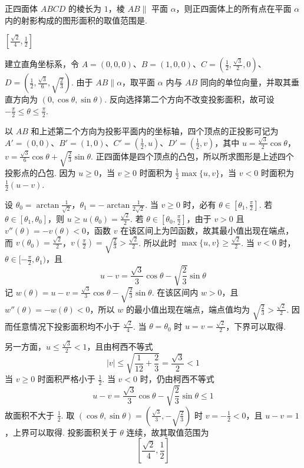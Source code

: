 \begin{problem}
正四面体 \(ABCD\) 的棱长为 \(1\)，棱 \(AB \parallel\) 平面 \(\alpha\)，则正四面体上的所有点在平面 \(\alpha\) 内的射影构成的图形面积的取值范围是\fillinblank{}.

\begin{answer}
\(\left[\frac{\sqrt{2}}{4}, \frac{1}{2}\right]\)
\end{answer}

\begin{solution}
建立直角坐标系，令 \(A=(0,0,0)\)、\(B=(1,0,0)\)、\(C=\left(\frac12,\frac{\sqrt3}{2},0\right)\)、\(D=\left(\frac12,\frac{\sqrt3}{6},\sqrt{\frac23}\right)\). 由于 \(AB\parallel\alpha\)，取平面 \(\alpha\) 内与 \(AB\) 同向的单位向量，并取其垂直方向为 \(\left(0,\cos\theta,\sin\theta\right)\). 反向选择第二个方向不改变投影面积，故可设 \(-\frac\pi2\leqslant\theta\leqslant\frac\pi2\).

以 \(AB\) 和上述第二个方向为投影平面内的坐标轴，四个顶点的正投影可记为 \(A'=(0,0)\)、\(B'=(1,0)\)、\(C'=\left(\frac12,u\right)\)、\(D'=\left(\frac12,v\right)\)，其中 \(u=\frac{\sqrt3}{2}\cos\theta\)，\(v=\frac{\sqrt3}{6}\cos\theta+\sqrt{\frac23}\sin\theta\). 正四面体是四个顶点的凸包，所以所求图形是上述四个投影点的凸包. 因为 \(u\geqslant0\)，当 \(v\geqslant0\) 时面积为 \(\frac12\max\{u,v\}\)，当 \(v<0\) 时面积为 \(\frac12(u-v)\).

设 \(\theta_0=\arctan\frac1{\sqrt2}\)，\(\theta_1=-\arctan\frac1{2\sqrt2}\). 当 \(v\geqslant0\) 时，必有 \(\theta\in[\theta_1,\frac\pi2]\). 若 \(\theta\in[\theta_1,\theta_0]\)，则 \(u\geqslant u(\theta_0)=\frac{\sqrt2}{2}\). 若 \(\theta\in[\theta_0,\frac\pi2]\)，由于 \(v>0\) 且 \(v''(\theta)=-v(\theta)<0\)，函数 \(v\) 在该区间上为凹函数，故其最小值出现在端点，而
\(v(\theta_0)=\frac{\sqrt2}{2}\)，\(v\left(\frac\pi2\right)=\sqrt{\frac23}>\frac{\sqrt2}{2}\).
所以此时 \(\max\{u,v\}\geqslant\frac{\sqrt2}{2}\). 当 \(v<0\) 时，\(\theta\in[-\frac\pi2,\theta_1)\)，且
\[
u-v=\frac{\sqrt3}{3}\cos\theta-\sqrt{\frac23}\sin\theta
\]
记 \(w(\theta)=u-v=\frac{\sqrt3}{3}\cos\theta-\sqrt{\frac23}\sin\theta\). 在该区间内 \(w>0\)，且 \(w''(\theta)=-w(\theta)<0\)，所以 \(w\) 的最小值出现在端点，端点值均为 \(\sqrt{\frac23}>\frac{\sqrt2}{2}\). 因而任意情况下投影面积均不小于 \(\frac{\sqrt2}{4}\). 当 \(\theta=\theta_0\) 时 \(u=v=\frac{\sqrt2}{2}\)，下界可以取得.

另一方面，\(u\leqslant\frac{\sqrt3}{2}<1\)，且由柯西不等式
\[
|v|\leqslant\sqrt{\frac1{12}+\frac23}=\frac{\sqrt3}{2}<1
\]
当 \(v\geqslant0\) 时面积严格小于 \(\frac12\). 当 \(v<0\) 时，仍由柯西不等式
\[
u-v=\frac{\sqrt3}{3}\cos\theta-\sqrt{\frac23}\sin\theta\leqslant1
\]
故面积不大于 \(\frac12\). 取 \((\cos\theta,\sin\theta)=\left(\frac{\sqrt3}{3},-\sqrt{\frac23}\right)\) 时 \(v=-\frac12<0\)，且 \(u-v=1\)，上界可以取得. 投影面积关于 \(\theta\) 连续，故其取值范围为
\[
\left[\frac{\sqrt2}{4},\frac12\right]
\]
\end{solution}
\end{problem}

